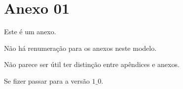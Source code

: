 



\chapter{Anexo 01}
\label{cap_an01}

Este é um anexo.

Não há renumeração para os anexos neste modelo.

Não parece ser útil ter distinção entre apêndices e anexos.

Se fizer passar para a versão $1\_0$.



